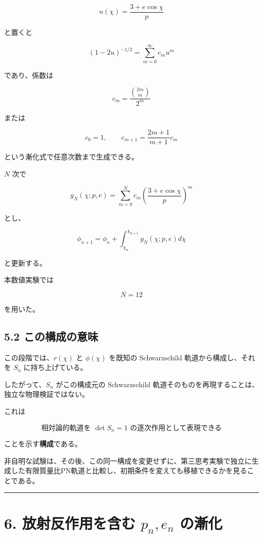 \documentclass[
  a4paper,
]{ltjsarticle}
\begin{document}
\[
u(\chi)=\frac{3+e\cos\chi}{p}
\]

と置くと

\[
(1-2u)^{-1/2}
=
\sum_{m=0}^{\infty}c_mu^m
\]

であり、係数は

\[
c_m=\frac{\binom{2m}{m}}{2^m}
\]

または

\[
\boxed{
c_0=1,
\qquad
c_{m+1}=\frac{2m+1}{m+1}c_m
}
\]

という漸化式で任意次数まで生成できる。

\(N\) 次で

\[
g_N(\chi;p,e)
=
\sum_{m=0}^{N}
c_m
\left(
\frac{3+e\cos\chi}{p}
\right)^m
\]

とし、

\[
\phi_{n+1}
=
\phi_n+
\int_{\chi_n}^{\chi_{n+1}}
g_N(\chi;p,e)d\chi
\]

と更新する。

本数値実験では

\[
N=12
\]

を用いた。

\subsection{5.2
この構成の意味}\label{ux3053ux306eux69cbux6210ux306eux610fux5473}

この段階では、\(r(\chi)\) と \(\phi(\chi)\) を既知の Schwarzschild
軌道から構成し、それを \(S_n\) に持ち上げている。

したがって、\(S_n\) がこの構成元の Schwarzschild
軌道そのものを再現することは、独立な物理検証ではない。

これは

\[
\boxed{
\text{相対論的軌道を }\det S_n=1\text{ の逐次作用として表現できる}
}
\]

ことを示す\textbf{構成}である。

非自明な試験は、その後、この同一構成を変更せずに、第三思考実験で独立に生成した有限質量比PN軌道と比較し、初期条件を変えても移植できるかを見ることである。

\begin{center}\rule{0.5\linewidth}{0.5pt}\end{center}

\section{\texorpdfstring{6. 放射反作用を含む \(p_n,e_n\)
の漸化}{6. 放射反作用を含む p\_n,e\_n の漸化}}\label{ux653eux5c04ux53cdux4f5cux7528ux3092ux542bux3080-p_ne_n-ux306eux6f38ux5316}
\end{document}
